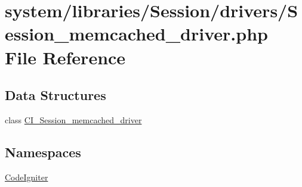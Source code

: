 \hypertarget{_session__memcached__driver_8php}{}\section{system/libraries/\+Session/drivers/\+Session\+\_\+memcached\+\_\+driver.php File Reference}
\label{_session__memcached__driver_8php}
\subsection*{Data Structures}
\begin{DoxyCompactItemize}
\item 
class \mbox{\hyperlink{class_c_i___session__memcached__driver}{C\+I\+\_\+\+Session\+\_\+memcached\+\_\+driver}}
\end{DoxyCompactItemize}
\subsection*{Namespaces}
\begin{DoxyCompactItemize}
\item 
 \mbox{\hyperlink{namespace_code_igniter}{Code\+Igniter}}
\end{DoxyCompactItemize}
